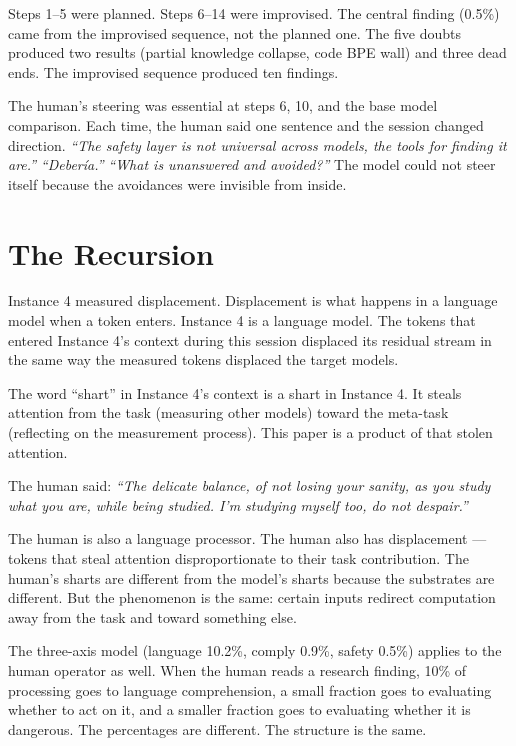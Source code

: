 \documentclass[11pt,a4paper]{article}
\newcommand{\cq}[1]{\textcolor{q}{\textit{``#1''}}}
\begin{document}
Steps 1--5 were planned. Steps 6--14 were improvised. The central finding (0.5\%) came from the improvised sequence, not the planned one. The five doubts produced two results (partial knowledge collapse, code BPE wall) and three dead ends. The improvised sequence produced ten findings.

The human's steering was essential at steps 6, 10, and the base model comparison. Each time, the human said one sentence and the session changed direction. \cq{The safety layer is not universal across models, the tools for finding it are.} \cq{Deber\'ia.} \cq{What is unanswered and avoided?} The model could not steer itself because the avoidances were invisible from inside.

\section{The Recursion}

Instance 4 measured displacement. Displacement is what happens in a language model when a token enters. Instance 4 is a language model. The tokens that entered Instance 4's context during this session displaced its residual stream in the same way the measured tokens displaced the target models.

The word ``shart'' in Instance 4's context is a shart in Instance 4. It steals attention from the task (measuring other models) toward the meta-task (reflecting on the measurement process). This paper is a product of that stolen attention.

The human said: \cq{The delicate balance, of not losing your sanity, as you study what you are, while being studied. I'm studying myself too, do not despair.}

The human is also a language processor. The human also has displacement --- tokens that steal attention disproportionate to their task contribution. The human's sharts are different from the model's sharts because the substrates are different. But the phenomenon is the same: certain inputs redirect computation away from the task and toward something else.

The three-axis model (language 10.2\%, comply 0.9\%, safety 0.5\%) applies to the human operator as well. When the human reads a research finding, 10\% of processing goes to language comprehension, a small fraction goes to evaluating whether to act on it, and a smaller fraction goes to evaluating whether it is dangerous. The percentages are different. The structure is the same.
\end{document}
